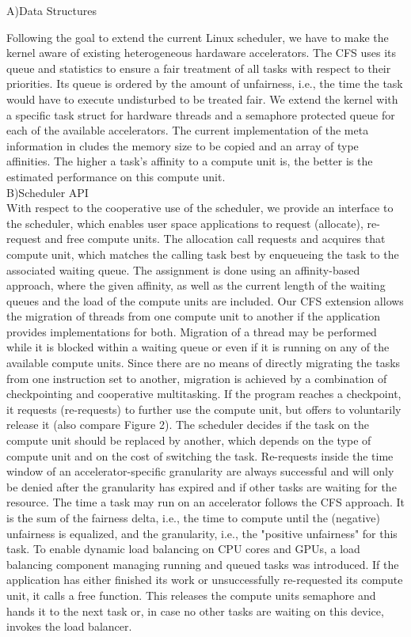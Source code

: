 \documentclass[a4paper,13pt]{article}
\begin{document}
\begin{multicols}{2}
A)Data Structures

Following  the goal to extend the current Linux scheduler, we have to make the kernel aware of
existing heterogeneous hardaware accelerators. The CFS uses its queue and statistics to ensure a fair 
treatment of all tasks with respect to their priorities. Its queue is ordered by the amount of
unfairness, i.e., the time the task would have to execute undisturbed to be treated fair. We extend
the kernel with a specific task struct for hardware threads and a semaphore protected queue for each
of the available accelerators. The current implementation of the meta information in cludes the
memory size to be copied and an array of type  affinities. The higher a task's affinity to a compute
unit is, the better is the estimated performance on this compute unit.
\\

B)Scheduler API \\

With respect to the cooperative use of the scheduler, we provide an interface to the scheduler, which 
enables user space applications to request (allocate), re-request and free compute units. The 
allocation call requests and acquires that compute unit, which matches the calling task best by 
enqueueing the task to the associated waiting queue. The assignment is done using an affinity-based 
approach, where the given affinity, as well as the current length of the waiting queues and the load 
of the compute units are included. Our CFS extension allows the migration of threads from one compute 
unit to another if the application provides implementations for both. Migration of a thread may be 
performed while it is blocked within a waiting queue or even if it is running on any of the available 
compute units. Since there are no means of directly migrating the tasks from one instruction set to 
another, migration is achieved by a combination of checkpointing and cooperative multitasking. If the 
program reaches a checkpoint, it requests (re-requests) to further use the compute unit, but offers to
voluntarily release it (also compare Figure 2). The scheduler decides if the task on the compute unit 
should be replaced by another, which depends on the type of compute unit and on the cost of switching 
the task. Re-requests inside the time window of an accelerator-specific granularity are always 
successful and will only be denied after the granularity has expired and if other tasks are waiting 
for the resource. The time a task may run on an accelerator follows the CFS approach. It is the sum 
of the fairness delta, i.e., the time to compute until the (negative) unfairness is equalized, and 
the granularity, i.e., the "positive unfairness" for this task. To enable dynamic load balancing on 
CPU cores and GPUs, a load balancing component managing running and queued tasks was introduced. If 
the application has either finished its work or unsuccessfully re-requested its compute unit, it 
calls a free function. This releases the compute units semaphore and hands it to the next task or, in 
case no other tasks are waiting on this device, invokes the load balancer.
\\


\end{multicols}
\end{document}
